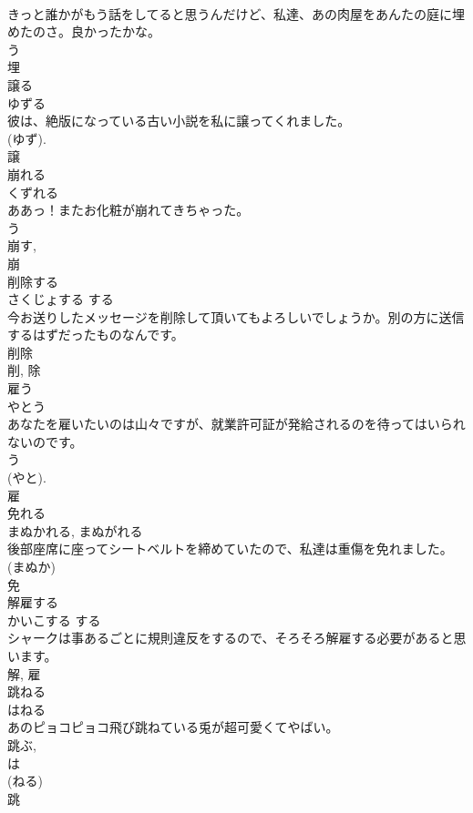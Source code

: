\documentclass[8pt]{extreport}
\begin{document}
\begin{CJK}{UTF8}{min}
\\	きっと誰かがもう話をしてると思うんだけど、私達、あの肉屋をあんたの庭に埋めたのさ。良かったかな。	
\\	う 
\\	埋	
\\	譲る	
\\	ゆずる	
\\	彼は、絶版になっている古い小説を私に譲ってくれました。	
\\	(ゆず). 
\\	譲	
\\	崩れる	
\\	くずれる	
\\	ああっ！またお化粧が崩れてきちゃった。	
\\	う 
\\	崩す, 
\\	崩	
\\	削除する	
\\	さくじょする	する 
\\	今お送りしたメッセージを削除して頂いてもよろしいでしょうか。別の方に送信するはずだったものなんです。	
\\	削除 
\\	削, 除	
\\	雇う	
\\	やとう	
\\	あなたを雇いたいのは山々ですが、就業許可証が発給されるのを待ってはいられないのです。	
\\	う 
\\	(やと). 
\\	雇	
\\	免れる	
\\	まぬかれる, まぬがれる	
\\	後部座席に座ってシートベルトを締めていたので、私達は重傷を免れました。	
\\	(まぬか) 
\\	免	
\\	解雇する	
\\	かいこする	する 
\\	シャークは事あるごとに規則違反をするので、そろそろ解雇する必要があると思います。	
\\	解, 雇	
\\	跳ねる	
\\	はねる	
\\	あのピョコピョコ飛び跳ねている兎が超可愛くてやばい。	
\\	跳ぶ, 
\\	は 
\\	(ねる) 
\\	跳	

\end{CJK}
\end{document}
